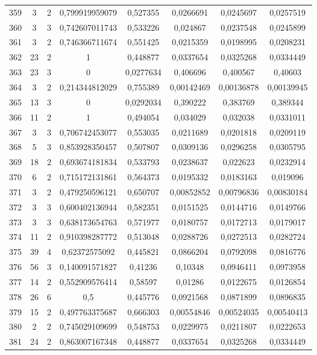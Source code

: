 \begin{longtable}{|c|c|c|c|c|c|c|c|}
359 & 3 & 2 & 0,799919959079 & 0,527355 & 0,0266691 & 0,0245697 & 0,0257519  \\
360 & 3 & 3 & 0,742607011743 & 0,533226 & 0,024867 & 0,0237548 & 0,0245899  \\
361 & 3 & 2 & 0,746366711674 & 0,551425 & 0,0215359 & 0,0198995 & 0,0208231  \\
362 & 23 & 2 & 1 & 0,448877 & 0,0337654 & 0,0325268 & 0,0334449  \\
363 & 23 & 3 & 0 & 0,0277634 & 0,406696 & 0,400567 & 0,40603  \\
364 & 3 & 2 & 0,214344812029 & 0,755389 & 0,00142469 & 0,00136878 & 0,00139945  \\
365 & 13 & 3 & 0 & 0,0292034 & 0,390222 & 0,383769 & 0,389344  \\
366 & 11 & 2 & 1 & 0,494054 & 0,034029 & 0,032038 & 0,0331011  \\
367 & 3 & 3 & 0,706742453077 & 0,553035 & 0,0211689 & 0,0201818 & 0,0209119  \\
368 & 5 & 3 & 0,853928350457 & 0,507807 & 0,0309136 & 0,0296258 & 0,0305795  \\
369 & 18 & 2 & 0,693674181834 & 0,533793 & 0,0238637 & 0,022623 & 0,0232914  \\
370 & 6 & 2 & 0,715172131861 & 0,564373 & 0,0195332 & 0,0183163 & 0,019096  \\
371 & 3 & 2 & 0,479250596121 & 0,650707 & 0,00852852 & 0,00796836 & 0,00830184  \\
372 & 3 & 3 & 0,600402136944 & 0,582351 & 0,0151525 & 0,0144716 & 0,0149766  \\
373 & 3 & 3 & 0,638173654763 & 0,571977 & 0,0180757 & 0,0172713 & 0,0179017  \\
374 & 11 & 2 & 0,910398287772 & 0,513048 & 0,0288726 & 0,0272513 & 0,0282724  \\
375 & 39 & 4 & 0,62372575092 & 0,445821 & 0,0866204 & 0,0792098 & 0,0816776  \\
376 & 56 & 3 & 0,140091571827 & 0,41236 & 0,10348 & 0,0946411 & 0,0973958  \\
377 & 14 & 2 & 0,552909576414 & 0,58597 & 0,01286 & 0,0122675 & 0,0126854  \\
378 & 26 & 6 & 0,5 & 0,445776 & 0,0921568 & 0,0871899 & 0,0896835  \\
379 & 15 & 2 & 0,497763375687 & 0,666303 & 0,00554846 & 0,00524035 & 0,00540413  \\
380 & 2 & 2 & 0,745029109699 & 0,548753 & 0,0229975 & 0,0211807 & 0,0222653  \\
381 & 24 & 2 & 0,863007167348 & 0,448877 & 0,0337654 & 0,0325268 & 0,0334449  \\

\end{longtable}
